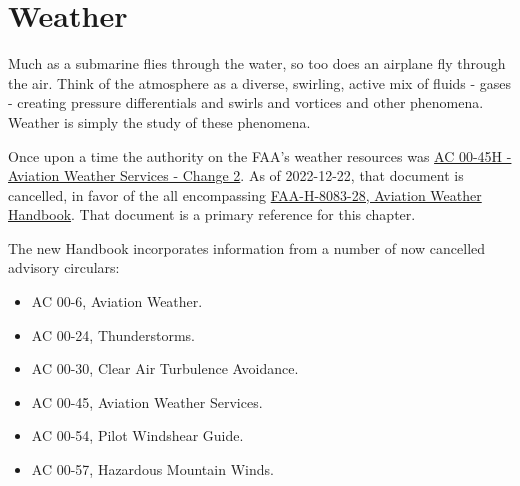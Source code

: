 \chapter{Weather}

Much as a submarine flies through the water, so too does an airplane fly through the air. Think of the atmosphere as a diverse, swirling, active mix of fluids - gases - creating pressure differentials and swirls and vortices and other phenomena. Weather is simply the study of these phenomena.

Once upon a time the authority on the FAA's weather resources was \href{https://www.faa.gov/regulations_policies/advisory_circulars/index.cfm/go/document.information/documentID/1030235}{AC 00-45H - Aviation Weather Services - Change 2}. As of 2022-12-22, that document is cancelled, in favor of the all encompassing \href{https://www.faa.gov/regulationspolicies/handbooksmanuals/aviation/faa-h-8083-28-aviation-weather-handbook}{FAA-H-8083-28, Aviation Weather Handbook}. That document is a primary reference for this chapter.

The new Handbook incorporates information from a number of now cancelled advisory circulars:

\begin{itemize}
\item AC 00-6, Aviation Weather.
\item AC 00-24, Thunderstorms.
\item AC 00-30, Clear Air Turbulence Avoidance.
\item AC 00-45, Aviation Weather Services.
\item AC 00-54, Pilot Windshear Guide.
\item AC 00-57, Hazardous Mountain Winds.
\end{itemize}



